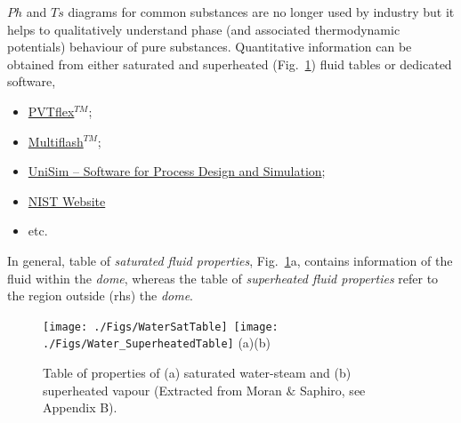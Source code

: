  $Ph$ and $Ts$ diagrams for common substances are no longer used by industry but it helps to qualitatively understand phase (and associated thermodynamic potentials) behaviour of pure substances. Quantitative information can be obtained from either saturated and superheated (Fig.~\ref{Mod03Fig03}) fluid tables or dedicated software, \eg
\begin{itemize}
   \item \href{http://www.weatherford.com/doc/wft183650}{PVTflex$^{TM}$};
   \item \href{http://www.kbcat.com/infochem-software/flow-assurance-software-multiflash/pvt-simulation}{Multiflash$^{TM}$};
   \item \href{https://www.honeywellprocess.com/en-US/explore/products/advanced-applications/unisim/Pages/default.aspx}{UniSim – Software for Process Design and Simulation};
   \item \href{http://webbook.nist.gov/chemistry/fluid/}{NIST Website}
   \item etc.
\end{itemize}
In general, table of {\it saturated fluid properties}, Fig.~\ref{Mod03Fig03}a, contains information of the fluid within the {\it dome}, whereas the table of {\it superheated fluid properties} refer to the region outside (rhs) the {\it dome}. 
%
   \begin{figure}[h]
      \vbox{
         \hbox{\texttt{[image: ./Figs/WaterSatTable]}
               \texttt{[image: ./Figs/Water\_SuperheatedTable]}}
         \vspace{-1.5cm}
         \hbox{\hspace{4cm}(a)\hspace{7cm}(b)}
      }
      \caption{ Table of properties of (a) saturated water-steam and (b) superheated vapour (Extracted from Moran $\&$ Saphiro, see Appendix B).}\label{Mod03Fig03}  
   \end{figure}
%
    

